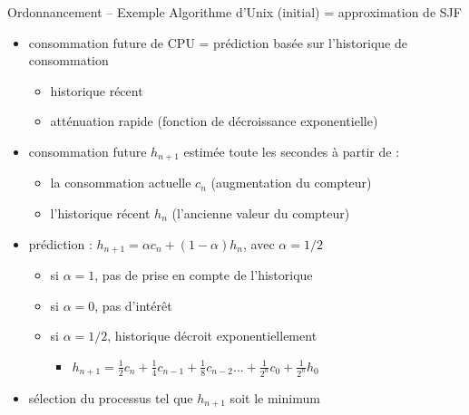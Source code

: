 \begin {frame} {Ordonnancement -- Exemple}
    Algorithme d'Unix (initial) = approximation de SJF

    \begin {itemize}
	\item consommation future de CPU = prédiction basée sur
	    l'historique de consommation
	    \begin {itemize}
		\item historique récent
		\item atténuation rapide (fonction de décroissance
		    exponentielle)

	    \end {itemize}
	\item consommation future $h_{n+1}$ estimée toute les secondes
	    à partir de :
	    \begin {itemize}
		\item la consommation actuelle $c_n$ (augmentation
		    du compteur)
		\item l'historique récent $h_n$ (l'ancienne valeur
		    du compteur)
	    \end {itemize}
	\item prédiction : $h_{n+1} = \alpha c_n + (1-\alpha) h_n$,
	    avec $\alpha = 1/2$
	    \begin {itemize}
		\item si $\alpha = 1$, pas de prise en compte de l'historique
		\item si $\alpha = 0$, pas d'intérêt
		\item si $\alpha = 1/2$, historique décroit exponentiellement
		    \begin {itemize}
			\item $h_{n+1} = \frac {1} {2} c_n
					+ \frac {1} {4} c_{n-1}
					+ \frac {1} {8} c_{n-2}
					\ldots
					+ \frac {1} {2^{n}} c_0
					+ \frac {1} {2^{n}} h_0$
		    \end {itemize}
	    \end {itemize}
	\item sélection du processus tel que $h_{n+1}$ soit le minimum

    \end {itemize}
\end {frame}
